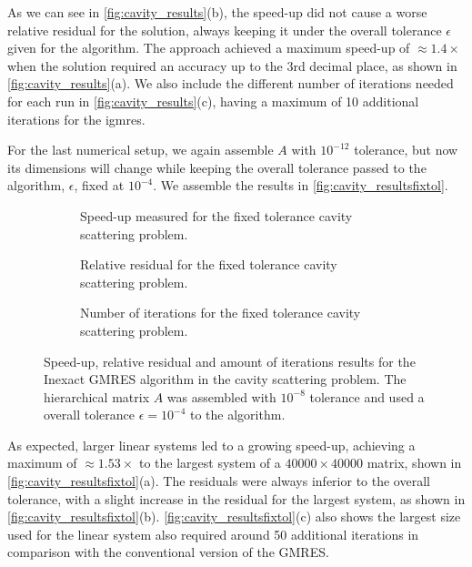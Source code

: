 As we can see in \autoref{fig:cavity_results}(b), the speed-up did not cause a worse relative residual for the solution, always keeping it under the overall tolerance $\epsilon$ given for the algorithm. The approach achieved a maximum speed-up of $\approx 1.4\times$ when the solution required an accuracy up to the 3rd decimal place, as shown in \autoref{fig:cavity_results}(a). We also include the different number of iterations needed for each run in \ref{fig:cavity_results}(c), having a maximum of 10 additional iterations for the \acrshort{igmres}.

For the last numerical setup, we again assemble $A$ with $10^{-12}$ tolerance, but now its dimensions will change while keeping the overall tolerance passed to the algorithm, $\epsilon$, fixed at $10^{-4}$. We assemble the results in \autoref{fig:cavity_resultsfixtol}.

\begin{figure}[h!]
    \centering
    \begin{subfigure}[b]{0.6\linewidth}
        
        \caption{Speed-up measured for the fixed tolerance cavity scattering problem.}
    \end{subfigure}
    \begin{subfigure}[b]{0.4\linewidth}
        
        \caption{Relative residual for the fixed tolerance cavity scattering problem.}
    \end{subfigure}
    \begin{subfigure}[b]{0.4\linewidth}
        
        \caption{Number of iterations for the fixed tolerance cavity scattering problem.}
    \end{subfigure}
    \caption{Speed-up, relative residual and amount of iterations results for the Inexact GMRES algorithm in the cavity scattering problem. The hierarchical matrix $A$ was assembled with $10^{-8}$ tolerance and used a overall tolerance $\epsilon = 10^{-4}$ to the algorithm.}
    \label{fig:cavity_resultsfixtol}
\end{figure}

As expected, larger linear systems led to a growing speed-up, achieving a maximum of $\approx 1.53\times$ to the largest system of a $40000 \times 40000$ matrix, shown in \autoref{fig:cavity_resultsfixtol}(a). The residuals were always inferior to the overall tolerance, with a slight increase in the residual for the largest system, as shown in \autoref{fig:cavity_resultsfixtol}(b). \autoref{fig:cavity_resultsfixtol}(c) also shows the largest size used for the linear system also required around 50 additional iterations in comparison with the conventional version of the GMRES.

